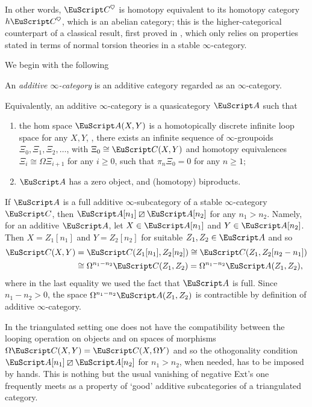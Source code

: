 In other words, $\C^\heart$ is homotopy equivalent to its homotopy category $h\C^\heart$, which is an abelian category; this is the higher-categorical counterpart of a classical result, first proved in \cite[\athm\textbf{1.3.6}]{BBDPervers}, 
which 
only relies on properties stated in terms of normal torsion theories in a stable $\infty$-category. 
{\color{green!40!black}
We begin with the following
\begin{definition}\label{df:additive}
An \emph{additive $\infty$-category}  is an additive
category regarded as an $\infty$-category.
\end{definition}
\begin{remark}
Equivalently, an additive $\infty$-category is a quasicategory $\cate{A}$
such that
\begin{enumerate}[label=$\roman*$)]
\item the hom space $\cate{A}(X,Y)$ is a homotopically discrete infinite loop space for any $X, Y$, \ie, there exists an infinite sequence of $\infty$-groupoids $\Xi_0, \Xi_1,\Xi_2,\dots$, with $\Xi_0\cong \C(X,Y)$ and homotopy equivalences $\Xi_i\cong \Omega \Xi_{i+1}$ for any $i\geq 0$, such that $\pi_n \Xi_0=0$ for any $n\geq 1$;
\item $\cate{A}$ has a zero object, and (homotopy) biproducts.
\end{enumerate}
\end{remark}
\begin{remark}\label{orthogonality-of-a}
If $\cA$ is a full additive $\infty$-subcategory of a stable $\infty$-category $\C$, then $\cA[n_1]\orth\cA[n_2]$ for any $n_1>n_2$. Namely, for an additive $\cA$, let $X\in \cA[n_1]$ and $Y\in\cA[n_2]$. Then $X=Z_1[n_1]$ and $Y=Z_2[n_2]$ for suitable $Z_1,Z_2\in \cA$ and so 
\begin{align*}
\C(X,Y)&=\C(Z_1[n_1],Z_2[n_2])\cong  \C(Z_1,Z_2[n_2-n_1])\\
&\cong \Omega^{n_1-n_2}\C(Z_1,Z_2)=\Omega^{n_1-n_2}\cA(Z_1,Z_2),
\end{align*}
where in the last equality we used the fact that $\cA$ is full. Since $n_1-n_2>0$, the space $\Omega^{n_1-n_2}\cA(Z_1,Z_2)$ is contractible by definition of additive $\infty$-category.
\end{remark}
\begin{remark}
In the triangulated setting one does not have the compatibility between the looping operation on objects and on spaces of morphisms $\Omega\C(X,Y)=\C(X,\Omega Y)$ and so the othogonality condition $\cA[n_1]\orth\cA[n_2]$ for $n_1>n_2$, when needed, has to be imposed by hands. This is nothing but the usual vanishing of negative Ext's one frequently meets as a property of `good' additive subcategories of a triangulated category.  
\end{remark}

}
